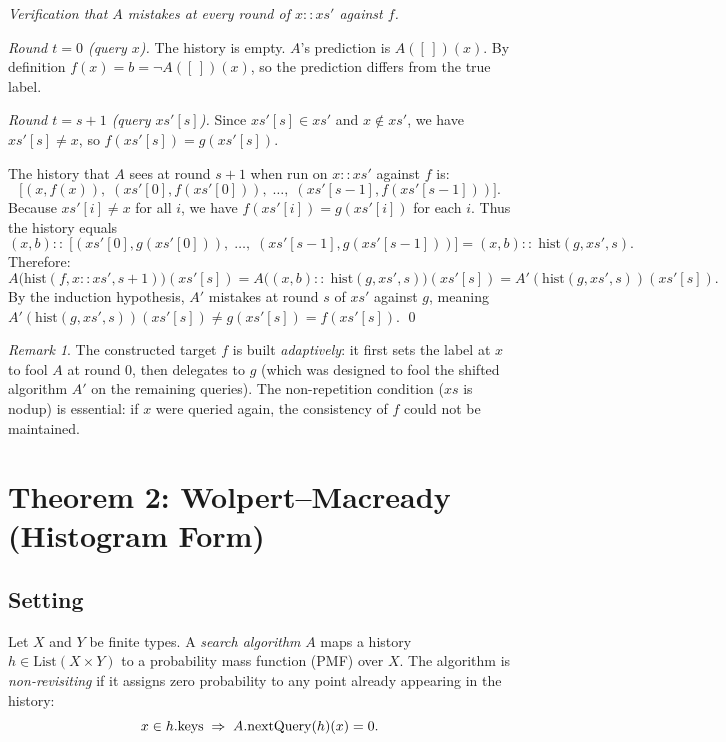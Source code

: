 \documentclass[11pt]{article}
\theoremstyle{remark}
\newtheorem*{remark}{Remark}
\newcommand{\histTo}{\mathrm{hist}}
\begin{document}
\medskip
\noindent\emph{Verification that $A$ mistakes at every round of $x :: xs'$
against $f$.}

\medskip
\noindent\textit{Round $t = 0$ (query $x$).}
The history is empty.  $A$'s prediction is $A([\,])(x)$.
By definition $f(x) = b = \neg A([\,])(x)$, so the prediction differs
from the true label.

\medskip
\noindent\textit{Round $t = s+1$ (query $xs'[s]$).}
Since $xs'[s] \in xs'$ and $x \notin xs'$, we have $xs'[s] \neq x$, so
$f(xs'[s]) = g(xs'[s])$.

The history that $A$ sees at round $s+1$ when run on $x :: xs'$ against
$f$ is:
\[
  \bigl[(x, f(x)),\; (xs'[0], f(xs'[0])),\; \ldots,\;
    (xs'[s-1], f(xs'[s-1]))\bigr].
\]
Because $xs'[i] \neq x$ for all $i$, we have $f(xs'[i]) = g(xs'[i])$
for each $i$.  Thus the history equals
\[
  (x, b) ::\; \bigl[(xs'[0], g(xs'[0])),\; \ldots,\;
    (xs'[s-1], g(xs'[s-1]))\bigr]
  = (x, b) ::\; \histTo(g, xs', s).
\]
Therefore:
\[
  A\!\bigl(\histTo(f, x :: xs', s+1)\bigr)(xs'[s])
  = A\!\bigl((x,b) ::\; \histTo(g, xs', s)\bigr)(xs'[s])
  = A'(\histTo(g, xs', s))(xs'[s]).
\]
By the induction hypothesis, $A'$ mistakes at round $s$ of $xs'$ against
$g$, meaning $A'(\histTo(g, xs', s))(xs'[s]) \neq g(xs'[s]) = f(xs'[s])$.
\qed

\medskip
\begin{remark}
The constructed target $f$ is built \emph{adaptively}: it first sets the
label at $x$ to fool $A$ at round 0, then delegates to $g$ (which was
designed to fool the shifted algorithm $A'$ on the remaining queries).
The non-repetition condition ($xs$ is nodup) is essential: if $x$ were
queried again, the consistency of $f$ could not be maintained.
\end{remark}


\section{Theorem 2: Wolpert--Macready (Histogram Form)}
\label{sec:wm}

\subsection{Setting}

Let $X$ and $Y$ be finite types.  A \emph{search algorithm} $A$ maps a
history $h \in \mathrm{List}(X \times Y)$ to a probability mass function
(PMF) over $X$.  The algorithm is \emph{non-revisiting} if it assigns
zero probability to any point already appearing in the history:
\[
  x \in h.{\rm keys} \;\Rightarrow\; A.\mathrm{nextQuery}(h)(x) = 0.
\]
\end{document}
